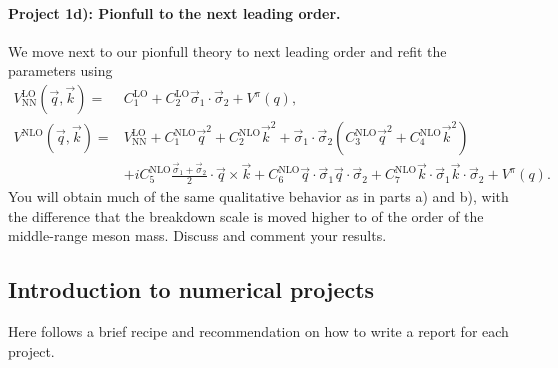 \documentclass[%
oneside,                 %
final,                   %
10pt]{article}
\begin{document}
\paragraph{Project 1d): Pionfull to the next leading order.}
We move next to our pionfull theory to next leading order and refit the parameters using
\begin{align*}
V^\mathrm{LO}_\mathrm{NN}(\vec{q},\vec{k})=&C^\mathrm{LO}_1+C^\mathrm{LO}_2\vec{\sigma}_1\cdot\vec{\sigma}_2+V^{\pi}(q),\\
V^\mathrm{NLO}(\vec{q},\vec{k})=&V^\mathrm{LO}_\mathrm{NN}+C^\mathrm{NLO}_1\vec{q}^2+C^\mathrm{NLO}_2\vec{k}^2+
\vec{\sigma}_1\cdot\vec{\sigma}_2\left(C^\mathrm{NLO}_3\vec{q}^2+C^\mathrm{NLO}_4\vec{k}^2\right)\\
&+iC^\mathrm{NLO}_5\frac{\vec{\sigma}_1+\vec{\sigma}_2}{2}\cdot\vec{q}\times\vec{k}+C^\mathrm{NLO}_6\vec{q}\cdot\vec{\sigma}_1\vec{q}\cdot\vec{\sigma}_2
+C^\mathrm{NLO}_7\vec{k}\cdot\vec{\sigma}_1\vec{k}\cdot\vec{\sigma}_2+V^{\pi}(q).
\end{align*}
You will obtain much of  the same qualitative behavior as in parts a) and b), with the difference 
that the breakdown scale is 
moved higher to of the order of the middle-range meson mass. Discuss and comment your results.




\subsection{Introduction to numerical projects}

Here follows a brief recipe and recommendation on how to write a report for each
project.
\end{document}
